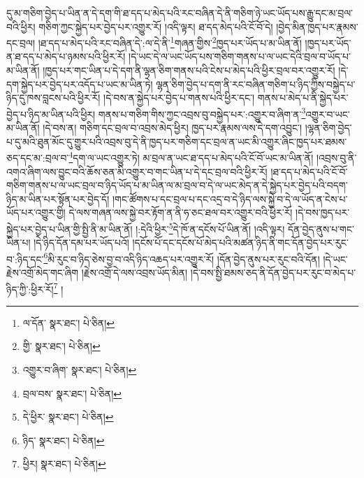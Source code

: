དུ་མ་གཅིག་བྱེད་པ་ཡིན་ན་དེ་དག་གི་ཐ་དད་པ་མེད་པའི་རང་བཞིན་དེ་ནི་གཅིག་ཉེ་ཡང་ཡོད་པས་རྒྱུ་དང་མ་བྲལ་བའི་ཕྱིར། གཅིག་ཀྱང་སྐྱེད་པར་བྱེད་པར་འགྱུར་རོ། །འདི་ལྟར། ཐ་དད་མེད་པའི་ངོ་བོ་དེ། །བྱེད་མིན་ཁྱད་པར་རྣམས་དང་བྲལ། །ཐ་དད་པ་མེད་པའི་རང་བཞིན་དེ་:ལ་དེ་ནི་\footnote{ལ་དོན་  སྣར་ཐང་།  པེ་ཅིན། }གཞན་གྱིས་\footnote{གྱི་  སྣར་ཐང་།  པེ་ཅིན། }ཁྱད་པར་ཡོད་པ་མ་ཡིན་ནོ། །ཁྱད་པར་ཡོད་ན་ཐ་དད་པ་མེད་པ་ཉམས་པའི་ཕྱིར་རོ། །དེ་ཡང་དེ་ལ་ཡང་ཡོད་པས་གཅིག་གནས་པ་ལ་ཡང་དེའི་བྲལ་བ་ཡོད་པ་མ་ཡིན་ནོ། །ཁྱད་པར་གང་ཡིན་པ་དེ་དག་ནི་ལྷན་ཅིག་གནས་པའི་ངེས་པ་མེད་པའི་ཕྱིར་བྲལ་བར་འགྱུར་རོ། །དེ་དག་སྐྱེད་པར་བྱེད་པར་འདོད་པ་ཡང་མ་ཡིན་ཏེ། ལྷན་ཅིག་བྱེད་པ་དག་ནི་རང་བཞིན་གཅིག་པ་ཉིད་ཀྱིས་བསྐྱེད་པ་ཉིད་དུ་ཁས་བླངས་པའི་ཕྱིར་རོ། །དེ་བས་ན་སྐྱེད་པར་བྱེད་པ་གནས་པའི་ཕྱིར་དང་། གནས་པ་མེད་པ་ནི་སྐྱེད་པར་བྱེད་པ་ཉིད་མ་ཡིན་པའི་ཕྱིར། གནས་པ་གཅིག་གིས་ཀྱང་འབྲས་བུ་བསྐྱེད་པར་:འགྱུར་བ་ཞིག་ན་\footnote{འགྱུར་བ་ཞིག་  སྣར་ཐང་།  པེ་ཅིན། }འགྱུར་བ་ཡང་མ་ཡིན་ནོ། །དེ་བས་ན། གཅིག་དང་བྲལ་བ་འབྲས་མེད་ཕྱིར། ཁྱད་པར་རྣམས་ལས་དེ་དག་འབྱུང་། །ལྷན་ཅིག་བྱེད་པ་དུ་མའི་ཐུན་མོང་དུ་གྱུར་པའི་འབྲས་བུ་དེ་ནི་ཁྱད་པར་གཅིག་དང་བྲལ་ན་ཡང་མི་འགྱུར་ཞིང་ཁྱད་པར་ཐམས་ཅད་དང་མ་:བྲལ་བ་\footnote{བྲལ་བས་  སྣར་ཐང་།  པེ་ཅིན། }དག་ལ་ཡང་འགྱུར་ཏེ། མ་བྲལ་ན་ཡང་ཐ་དད་པ་མེད་པའི་ངོ་བོ་ཡང་མ་ཡིན་ནོ། །འབྲས་བུ་ནི་འགའ་ཞིག་ལས་བྱུང་བའི་ཆོས་ཅན་མི་འགྱུར་བ་གང་ཡིན་པ་དེ་དང་བྲལ་བའི་ཕྱིར་རོ། །ཐ་དད་པ་མེད་པའི་ངོ་བོ་གཅིག་གནས་པ་ལ་ཡང་བྲལ་བ་ཉིད་ཡོད་པ་མ་ཡིན་ལ་མ་བྲལ་བ་དེ་ལ་ཡང་མེད་ན་དེ་སྐྱེད་པར་བྱེད་པའི་བདག་ཉིད་མ་ཡིན་པར་སྟོན་པར་བྱེད་དོ། །གང་ཚོགས་པ་དང་བྲལ་པ་དང་འདྲ་བ་དེ་ཉིད་ལས་སྐྱེ་བ་དེ་ལ་ཡོད་ན་ངེས་པ་ཡོད་པར་འགྱུར་གྱི། དེ་ལས་གཞན་ལས་སྐྱེ་བར་རྟོག་ན་ནི་ཧ་ཅང་ཐལ་བར་འགྱུར་བའི་ཕྱིར་རོ། །དེ་བས་ཁྱད་པར་སྐྱེད་པར་བྱེད་པ་ཡིན་གྱི་སྤྱི་ནི་མ་ཡིན་ནོ། །:དེའི་ཕྱིར་\footnote{དེ་ཕྱིར་  སྣར་ཐང་།  པེ་ཅིན། }དེ་ཁོ་ན་དངོས་པོ་ཡིན་ནོ། །འདི་ལྟར། དོན་བྱེད་ནུས་པ་གང་ཡིན་པ། །དེ་ཉིད་དོན་དམ་པར་ཡོད་པའོ། །དངོས་པོ་དང་དངོས་པོ་མེད་པའི་མཚན་ཉིད་ནི་གང་དོན་བྱེད་པར་རུང་བ་:ཉིད་དང་\footnote{ཉིད་  སྣར་ཐང་།  པེ་ཅིན། }མི་རུང་བ་ཉིད་ཅེས་བྱ་བ་འདི་ཉིད་འཆད་པར་འགྱུར་རོ། །དོན་བྱེད་ནུས་པར་རུང་བའི་དོན། །དེ་ཡང་རྗེས་འགྲོ་མེད་གང་ཞིག །རྗེས་འགྲོ་དེ་ལས་འབྲས་ཡོད་མིན། །དེ་བས་སྤྱི་ཐམས་ཅད་ནི་དོན་བྱེད་པར་རུང་བ་མེད་པ་ཉིད་ཀྱི་:ཕྱིར་རོ།\footnote{ཕྱིར།  སྣར་ཐང་།  པེ་ཅིན། } །
